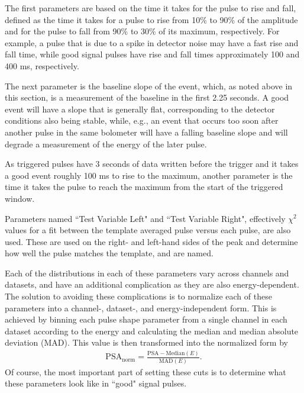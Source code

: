 \begin{description}[align=left]
\item [Rise and fall times] The first parameters are based on the time it takes for the pulse to rise and fall, defined as the time it takes for a pulse to rise from 10\% to 90\% of the amplitude and for the pulse to fall from 90\% to 30\% of its maximum, respectively.
For example, a pulse that is due to a spike in detector noise may have a fast rise and fall time, while good signal pulses have rise and fall times approximately 100 and 400 ms, respectively.
\item [Baseline slope] The next parameter is the baseline slope of the event, which, as noted above in this section, is a measurement of the baseline in the first 2.25 seconds.
A good event will have a slope that is generally flat, corresponding to the detector conditions also being stable, while, e.g., an event that occurs too soon after another pulse in the same bolometer will have a falling baseline slope and will degrade a measurement of the energy of the later pulse.
\item [Peak delay] As triggered pulses have 3 seconds of data written before the trigger and it takes a good event roughly 100 ms to rise to the maximum, another parameter is the time it takes the pulse to reach the maximum from the start of the triggered window.
\item [TVL and TVR] Parameters named ``Test Variable Left" and ``Test Variable Right", effectively $\chi^2$ values for a fit between the template averaged pulse versus each pulse, are also used.
These are used on the right- and left-hand sides of the peak and determine how well the pulse matches the template, and are named.
\end{description}
Each of the distributions in each of these parameters vary across channels and datasets, and have an additional complication as they are also energy-dependent.
The solution to avoiding these complications is to normalize each of these parameters into a channel-, dataset-, and energy-independent form.
This is achieved by binning each pulse shape parameter from a single channel in each dataset according to the energy and calculating the median and median absolute deviation (MAD).
This value is then transformed into the normalized form by
\begin{align}
    \textrm{PSA}_{\textrm{norm}} = \frac{\textrm{PSA} - \textrm{Median}(E)}{\textrm{MAD}(E)}.
\end{align}
Of course, the most important part of setting these cuts is to determine what these parameters look like in ``good" signal pulses.
